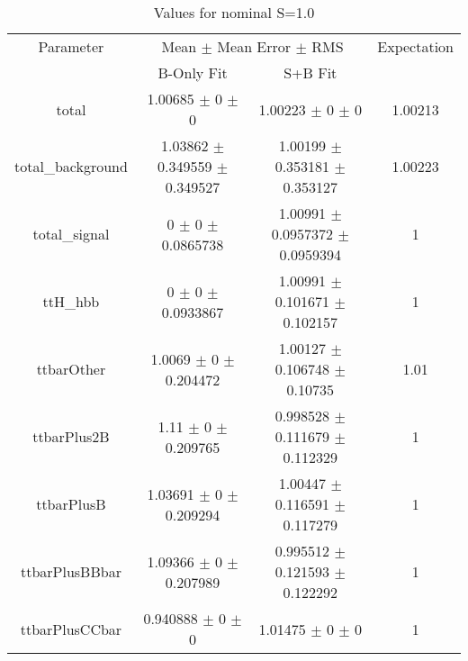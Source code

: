 \begin{table}
\centering
\caption{Values for nominal S=1.0}
\begin{tabular}{cccc}
\toprule
Parameter & \multicolumn{2}{c}{Mean $\pm$ Mean Error $\pm$ RMS} & Expectation\\
 & B-Only Fit & S+B Fit & \\
\midrule
total & \num{1.00685} $\pm$ \num{0} $\pm$ \num{0} & \num{1.00223} $\pm$ \num{0} $\pm$ \num{0} & \num{1.00213}\\
total\_background & \num{1.03862} $\pm$ \num{0.349559} $\pm$ \num{0.349527} & \num{1.00199} $\pm$ \num{0.353181} $\pm$ \num{0.353127} & \num{1.00223}\\
total\_signal & \num{0} $\pm$ \num{0} $\pm$ \num{0.0865738} & \num{1.00991} $\pm$ \num{0.0957372} $\pm$ \num{0.0959394} & \num{1}\\
ttH\_hbb & \num{0} $\pm$ \num{0} $\pm$ \num{0.0933867} & \num{1.00991} $\pm$ \num{0.101671} $\pm$ \num{0.102157} & \num{1}\\
ttbarOther & \num{1.0069} $\pm$ \num{0} $\pm$ \num{0.204472} & \num{1.00127} $\pm$ \num{0.106748} $\pm$ \num{0.10735} & \num{1.01}\\
ttbarPlus2B & \num{1.11} $\pm$ \num{0} $\pm$ \num{0.209765} & \num{0.998528} $\pm$ \num{0.111679} $\pm$ \num{0.112329} & \num{1}\\
ttbarPlusB & \num{1.03691} $\pm$ \num{0} $\pm$ \num{0.209294} & \num{1.00447} $\pm$ \num{0.116591} $\pm$ \num{0.117279} & \num{1}\\
ttbarPlusBBbar & \num{1.09366} $\pm$ \num{0} $\pm$ \num{0.207989} & \num{0.995512} $\pm$ \num{0.121593} $\pm$ \num{0.122292} & \num{1}\\
ttbarPlusCCbar & \num{0.940888} $\pm$ \num{0} $\pm$ \num{0} & \num{1.01475} $\pm$ \num{0} $\pm$ \num{0} & \num{1}\\
\bottomrule
\end{tabular}
\end{table}